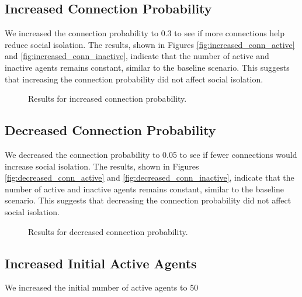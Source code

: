 \documentclass{article} %
\begin{document}
\subsection{Increased Connection Probability}
\label{sec:increased_connection}
We increased the connection probability to 0.3 to see if more connections help reduce social isolation. The results, shown in Figures \ref{fig:increased_conn_active} and \ref{fig:increased_conn_inactive}, indicate that the number of active and inactive agents remains constant, similar to the baseline scenario. This suggests that increasing the connection probability did not affect social isolation.

\begin{figure}[t]
    \centering
    \caption{Results for increased connection probability.}
    \label{fig:increased_conn_results}
\end{figure}

\subsection{Decreased Connection Probability}
\label{sec:decreased_connection}
We decreased the connection probability to 0.05 to see if fewer connections would increase social isolation. The results, shown in Figures \ref{fig:decreased_conn_active} and \ref{fig:decreased_conn_inactive}, indicate that the number of active and inactive agents remains constant, similar to the baseline scenario. This suggests that decreasing the connection probability did not affect social isolation.

\begin{figure}[t]
    \centering
    \caption{Results for decreased connection probability.}
    \label{fig:decreased_conn_results}
\end{figure}

\subsection{Increased Initial Active Agents}
\label{sec:increased_initial_active}
We increased the initial number of active agents to 50%
\end{document}
